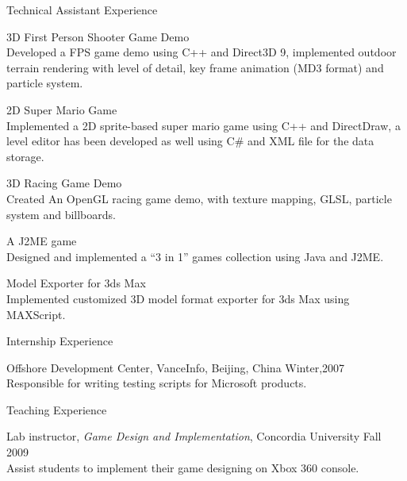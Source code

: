 \documentclass[10pt]{article}
\newenvironment{mydescription}{%
    \begin{description}
        \setlength{\itemsep}{0.25em}%
        \setlength{\parsep}{0em}%
        \setlength{\topsep}{\itemsep}%
        \setlength{\parskip}{0em}%
        \setlength{\labelwidth}{0.1em}
        \setlength{\labelsep}{0em} 
    }%
{\end{description}}
\begin{document}
\begin{cv}
\begin{cvlist}{Technical Assistant Experience}
\begin{mydescription}
        \item[3D First Person Shooter Game Demo] \hfill \\ 
            Developed a FPS game demo using C++ and Direct3D 9, implemented outdoor terrain rendering with level of detail, key frame animation (MD3 format) and particle system.
            
        \item[2D Super Mario Game] \hfill \\
            Implemented a 2D sprite-based super mario game using C++ and DirectDraw, a level editor has been developed as well using C\# and XML file for the data storage.
       
        \item[3D Racing Game Demo] \hfill \\ 
            Created An OpenGL racing game demo, with texture mapping, GLSL, particle system and billboards.
            
        \item[A J2ME game] \hfill \\
            Designed and implemented a ``3 in 1'' games collection using Java and J2ME.  
            
        \item[Model Exporter for 3ds Max] \hfill \\
            Implemented customized 3D model format exporter for 3ds Max using MAXScript. 
    \end{mydescription}
\end{cvlist}

\begin{cvlist}{Internship Experience}
\item 
    \begin{mydescription}
        \item[Offshore Development Center, VanceInfo, Beijing, China] \hfill Winter,2007 \\ 
            Responsible for writing testing scripts for Microsoft products. 
    \end{mydescription}
\end{cvlist}

\begin{cvlist}{Teaching Experience}
\item
    \begin{mydescription}
        \item[Lab instructor, \emph{Game Design and Implementation}, Concordia University] \hfill Fall 2009\\
            Assist students to implement their game designing on Xbox 360 console. 


\end{mydescription}
\end{cvlist}
\end{cv}
\end{document}
